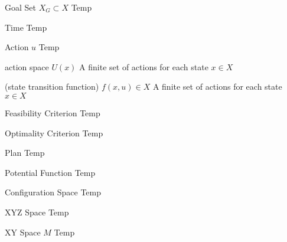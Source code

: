 \begin{definition}{Goal Set $X_G \subset X$}
Temp
\end{definition}

\begin{definition}{Time}
Temp
\end{definition}

\begin{definition}{Action $u$}
Temp
\end{definition}

\begin{definition}{action space $U(x)$}
A finite set of actions for each state $x \in X$
\end{definition}

\begin{definition}{(state transition function)}
 $f(x,u) \in X$
A finite set of actions for each state $x \in X$
\end{definition}

\begin{definition}{Feasibility Criterion}
Temp
\end{definition}

\begin{definition}{Optimality Criterion}
Temp
\end{definition}

\begin{definition}{Plan}
Temp
\end{definition}

\begin{definition}{Potential Function}
Temp
\end{definition}

\begin{definition}{Configuration Space}
Temp
\end{definition}

\begin{definition}{XYZ Space}
Temp
\end{definition}

\begin{definition}{XY Space $M$}
Temp
\end{definition}

